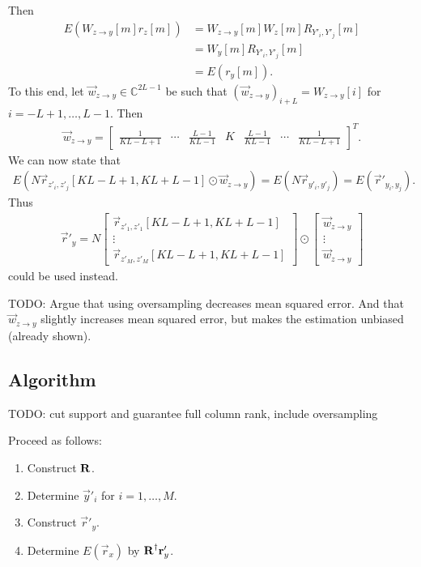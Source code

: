 \documentclass[a4paper, openany, oneside]{memoir}
\begin{document}
Then
\begin{align*}
    E(W_{z \to y}[m]r_z[m]) &= W_{z \to y}[m] W_z[m] R_{Y'_i,Y'_j}[m] \\
    &= W_y[m] R_{Y'_i,Y'_j}[m] \\
    &= E(r_y[m]).
\end{align*}
To this end, let $\vec{w}_{z \to y} \in \mathbb{C}^{2L-1}$ be such that $(\vec{w}_{z \to y})_{i+L} = W_{z \to y}[i]$ for $i = -L+1,\ldots,L-1$. Then
\begin{align*}
    \vec{w}_{z \to y} =\begin{bmatrix}
        \frac{1}{KL - L + 1} & \cdots & \frac{L- 1}{KL - 1} & K & \frac{L- 1}{KL - 1} & \cdots & \frac{1}{KL - L + 1}
    \end{bmatrix}^T.
\end{align*} 
We can now state that
\begin{align*}
    E(N \vec{r}_{z'_i,z'_j}[KL-L+1,KL+L-1] \odot \vec{w}_{z \to y}) = E(N \vec{r}_{y'_i,y'_j}) = E(\vec{r}'_{y_i,y_j}).
\end{align*}
Thus
\begin{align*}
    \vec{r}'_y = N\begin{bmatrix}
        \vec{r}_{z'_1,z'_1}[KL-L+1,KL+L-1] \\
        \vdots \\
        \vec{r}_{z'_M,z'_M}[KL-L+1,KL+L-1]
    \end{bmatrix} \odot \begin{bmatrix}
        \vec{w}_{z \to y} \\
        \vdots \\
        \vec{w}_{z \to y} 
    \end{bmatrix}
\end{align*}
could be used instead.

TODO: Argue that using oversampling decreases mean squared error. And that $\vec{w}_{z\to y}$ slightly increases mean squared error, but makes the estimation unbiased (already shown).


\subsection{Algorithm}
TODO: cut support and guarantee full column rank, include oversampling

Proceed as follows:
\begin{enumerate}
    \item Construct $\boldsymbol{\mathbf{R}}$.
    \item Determine $\vec{y}'_i$ for $i = 1,\ldots,M$.
    \item Construct $\vec{r}'_y$.
    \item Determine $E(\vec{r}_x)$ by $\boldsymbol{\mathbf{R}}^\dagger\boldsymbol{\mathbf{r}}'_y$.
\end{enumerate}
\end{document}
